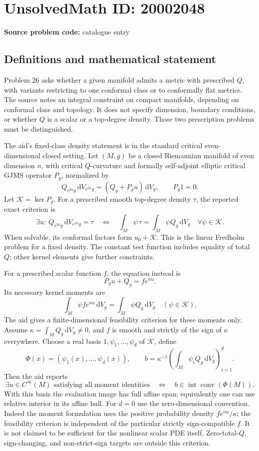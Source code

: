 \documentclass[11pt]{article}
\newcommand{\dd}{\,\mathrm{d}}
\begin{document}
\section*{UnsolvedMath ID: 20002048}
\textbf{Source problem code:} catalogue entry
\subsection{Definitions and mathematical statement}
Problem 26 asks whether a given manifold admits a metric with prescribed \(Q\), with variants restricting to one conformal class or to conformally flat metrics. The source notes an integral constraint on compact manifolds, depending on conformal class and topology. It does not specify dimension, boundary conditions, or whether \(Q\) is a scalar or a top-degree density. Those two prescription problems must be distinguished.

The aid's fixed-class density statement is in the standard critical even-dimensional closed setting. Let \((M,g)\) be a closed Riemannian manifold of even dimension \(n\), with critical \(Q\)-curvature and formally self-adjoint elliptic critical GJMS operator \(P_g\), normalized by
\[
 Q_{e^{2u}g}\dd V_{e^{2u}g}
 =(Q_g+P_gu)\dd V_g,
 \qquad P_g1=0.
\]
Let \(\mathcal K=\ker P_g\). For a prescribed smooth top-degree density \(\tau\), the reported exact criterion is
\[
 \exists u:\ Q_{e^{2u}g}\dd V_{e^{2u}g}=\tau
 \quad\Longleftrightarrow\quad
 \int_M\psi\,\tau=\int_M\psi Q_g\dd V_g
 \quad\forall\psi\in\mathcal K.
\]
When solvable, its conformal factors form \(u_0+\mathcal K\). This is the linear Fredholm problem for a fixed density. The constant test function includes equality of total \(Q\); other kernel elements give further constraints.

For a prescribed scalar function \(f\), the equation instead is
\[
 P_gu+Q_g=f e^{nu}.
\]
Its necessary kernel moments are
\[
 \int_M\psi f e^{nu}\dd V_g=\int_M\psi Q_g\dd V_g
 \quad(\psi\in\mathcal K).
\]
The aid gives a finite-dimensional feasibility criterion for these moments only. Assume
\(\kappa=\int_MQ_g\dd V_g\ne0\), and \(f\) is smooth and strictly of the sign of \(\kappa\) everywhere. Choose a real basis \(1,\psi_1,\ldots,\psi_d\) of \(\mathcal K\), define
\[
 \Phi(x)=(\psi_1(x),\ldots,\psi_d(x)),\qquad
 b=\kappa^{-1}\left(\int_M\psi_iQ_g\dd V_g\right)_{i=1}^d.
\]
Then the aid reports
\[
 \exists u\in C^\infty(M)\text{ satisfying all moment identities}
 \quad\Longleftrightarrow\quad
 b\in\operatorname{int}\operatorname{conv}(\Phi(M)).
\]
With this basis the evaluation image has full affine span; equivalently one can use relative interior in its affine hull. For \(d=0\) use the zero-dimensional convention. Indeed the moment formulation uses the positive probability density \(f e^{nu}/\kappa\); the feasibility criterion is independent of the particular strictly sign-compatible \(f\). It is not claimed to be sufficient for the nonlinear scalar PDE itself. Zero-total-\(Q\), sign-changing, and non-strict-sign targets are outside this criterion.
\end{document}
